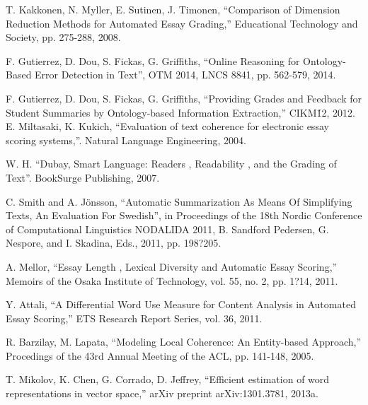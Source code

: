 \documentclass[12pt]{diicc}
\begin{document}
\begin{thebibliography} {}
	 T. Kakkonen, N. Myller, E. Sutinen, J. Timonen, ``Comparison of Dimension Reduction Methods for Automated Essay Grading,'' Educational Technology and Society, pp. 275-288, 2008.
	
	 F. Gutierrez, D. Dou, S. Fickas, G. Griffiths, ``Online Reasoning for Ontology-Based Error Detection in Text'', OTM 2014, LNCS 8841, pp. 562-579, 2014.
	
	 F. Gutierrez, D. Dou, S. Fickas, G. Griffiths, ``Providing Grades and Feedback for Student Summaries by Ontology-based Information Extraction,'' CIKM\' 12, 2012.
	 E. Miltasaki, K. Kukich, ``Evaluation of text coherence for electronic essay scoring systems,''. Natural Language Engineering, 2004.
	
	 W. H. ``Dubay, Smart Language: Readers , Readability , and the
Grading of Text''. BookSurge Publishing, 2007.

	 C. Smith and A. Jönsson, ``Automatic Summarization As Means Of Simplifying Texts, An Evaluation For Swedish'', in Proceedings of the 18th Nordic Conference of Computational Linguistics NODALIDA 2011, B. Sandford Pedersen, G. Nespore, and I. Skadina, Eds., 2011, pp. 198?205.

	 A. Mellor, ``Essay Length , Lexical Diversity and Automatic Essay Scoring,'' Memoirs of the Osaka Institute of Technology, vol. 55, no. 2, pp. 1?14, 2011.
	
	 Y. Attali, ``A Differential Word Use Measure for Content Analysis in Automated Essay Scoring,'' ETS Research Report Series, vol. 36, 2011.
	
	 R. Barzilay, M. Lapata, ``Modeling Local Coherence: An Entity-based Approach,'' Procedings of the 43rd Annual Meeting of the ACL, pp. 141-148, 2005.
	
	 T. Mikolov, K. Chen, G. Corrado, D. Jeffrey, ``Efficient estimation of word representations in vector space,'' arXiv preprint arXiv:1301.3781, 2013a.

\end{thebibliography}
\end{document}

